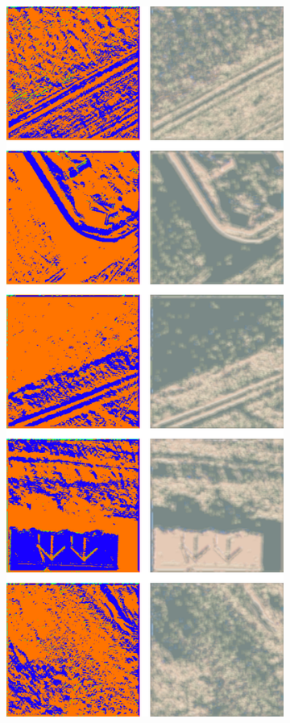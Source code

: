 \begin{figure}[h]
\begin{subfigure}{\WnetPredictionsImageWidth}
        \caption{}
        \label{fig:wnet_pred_36d-6}
    \end{subfigure} \hspace{3mm}
    \begin{subfigure}{\WnetPredictionsImageWidth}
        \includegraphics[width=\textwidth]{images/wnet/46d-6}

\end{subfigure}
\end{figure}
